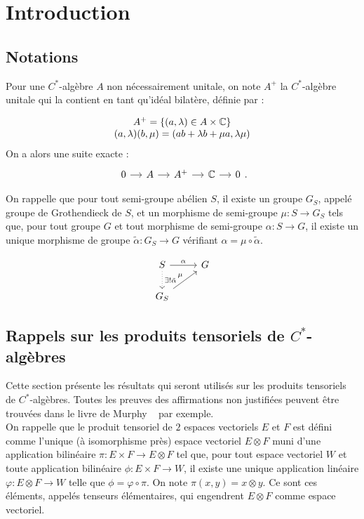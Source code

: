 \section{Introduction}
\subsection{Notations}

Pour une $C^*$-algèbre $A$ non nécessairement unitale, on note $A^+$ la $C^*$-algèbre unitale qui la contient en tant qu'idéal bilatère, définie par :

\[\begin{array}{c}A^+=\{(a,\lambda)\in A\times \mathbb C \} \\ (a,\lambda)(b,\mu)=(ab+\lambda b +\mu a,\lambda\mu)\end{array}\]
 On a alors une suite exacte :
\[\begin{tikzcd}[column sep = small] 0 \arrow{r} &  A \arrow{r} & A^+ \arrow{r} & \C \arrow{r} & 0 \end{tikzcd}.\]

On rappelle que pour tout semi-groupe abélien $S$, il existe un groupe $G_S$, appelé groupe de Grothendieck de $S$, et un morphisme de semi-groupe $\mu : S\rightarrow G_S$ tels que, pour tout groupe $G$ et tout morphisme de semi-groupe $\alpha : S\rightarrow G$, il existe un unique morphisme de groupe $\tilde \alpha : G_S \rightarrow G$ vérifiant $\alpha = \mu \circ \tilde\alpha$. 

\[\begin{tikzcd} S \arrow{r}{\alpha} \arrow[dotted]{d}{\exists !\tilde\alpha}& G \\
	G_S \arrow{ur}{\mu} & \end{tikzcd}\]
 
\subsection{Rappels sur les produits tensoriels de $C^*$-algèbres}

Cette section présente les résultats qui seront utilisés sur les produits tensoriels de $C^*$-algèbres. Toutes les preuves des affirmations non justifiées peuvent être trouvées dans le livre de Murphy ~\cite{Murphy} par exemple.\\

On rappelle que le produit tensoriel de $2$ espaces vectoriels $E$ et $F$ est défini comme l'unique (à isomorphisme près) espace vectoriel $E\otimes F$ muni d'une application bilinéaire $\pi : E\times F \rightarrow E\otimes F$ tel que, pour tout espace vectoriel $W$ et toute application bilinéaire $\phi : E \times F \rightarrow W $, il existe une unique application linéaire $\varphi :E\otimes F \rightarrow W$ telle que $\phi = \varphi\circ \pi$. On note $\pi(x,y)=x\otimes y$. Ce sont ces éléments, appelés tenseurs élémentaires, qui engendrent $E\otimes F$ comme espace vectoriel.\\ 

